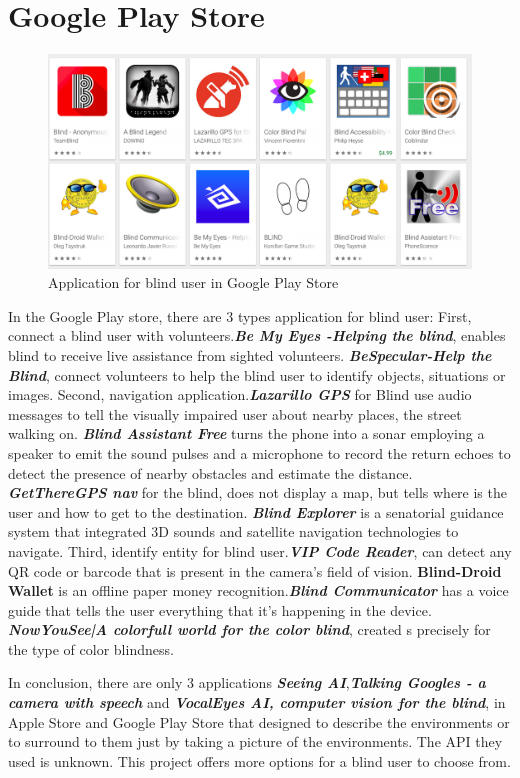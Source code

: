 \documentclass[11pt]{ucscthesis}
\begin{document}
\section{Google Play Store}
\begin{figure}
    \centering
    \includegraphics[width =0.8\linewidth]{Fig/GooglePlayStore.png}
    \caption{Application for blind user in Google Play Store}
    \label{Application for blind user in Google Play Store}
\end{figure}
In the Google Play store, there are 3 types application for blind user: First, connect a blind user with volunteers.\textbf{\textit{Be My Eyes -Helping the blind}}, enables blind to receive live assistance from sighted volunteers. \textbf{\textit{BeSpecular-Help the Blind}}, connect volunteers to help the blind user to identify objects, situations or images. Second, navigation application.\textbf{\textit{Lazarillo GPS}} for Blind use audio messages to tell the visually impaired user about nearby places, the street walking on. \textbf{\textit{Blind Assistant Free}}  turns the phone into a sonar employing a speaker to emit the sound pulses and a microphone to record the return echoes to detect the presence of nearby obstacles and estimate the distance. \textbf{\textit{GetThereGPS nav}} for the blind, does not display a map, but tells where is the user and how to get to the destination.
\textbf{\textit{Blind Explorer}} is a senatorial guidance system that integrated 3D sounds and satellite navigation technologies to navigate. Third, identify entity for blind user.\textbf{\textit{VIP Code Reader}}, can detect any QR code or barcode that is present in the camera's field of vision. \textbf{\textit{}Blind-Droid Wallet} is an offline paper money recognition.\textbf{\textit{Blind Communicator}} has a voice guide that tells the user everything that it's happening in the device. \textbf{\textit{NowYouSee|A colorfull world for the color blind}}, created s precisely for the type of color blindness.


In conclusion, there are only 3 applications  \textbf{\textit{Seeing AI}},\textbf{\textit{Talking Googles - a camera with speech}} and \textbf{\textit{VocalEyes AI, computer vision for the blind}}, in Apple Store and Google Play Store that designed to describe the environments or to surround to them just by taking a picture of the environments. The API they used is unknown. This project offers more options for a blind user to choose from.
\end{document}
